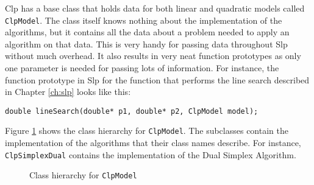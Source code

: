 Clp has a base class that holds data for both linear and quadratic models
called \texttt{ClpModel}.
The class itself knows nothing about the implementation of the algorithms, but
it contains all the data about a problem needed to apply an algorithm on that
data.
This is very handy for passing data throughout Slp without much overhead.
It also results in very neat function prototypes as only one parameter
is needed for passing lots of information. For instance, the function prototype
in Slp for the function that performs the line search described in Chapter
\ref{ch:slp} looks like this:
\begin{verbatim}
double lineSearch(double* p1, double* p2, ClpModel model);
\end{verbatim}
Figure \ref{fig:clpmodel} shows the class hierarchy for \texttt{ClpModel}.
The subclasses contain the implementation of the algorithms that their class
names describe. For instance, \texttt{ClpSimplexDual} contains the
implementation of the Dual Simplex Algorithm.
\begin{figure}
\centering
{}
\caption{Class hierarchy for \texttt{ClpModel}}
\label{fig:clpmodel}
\end{figure}
